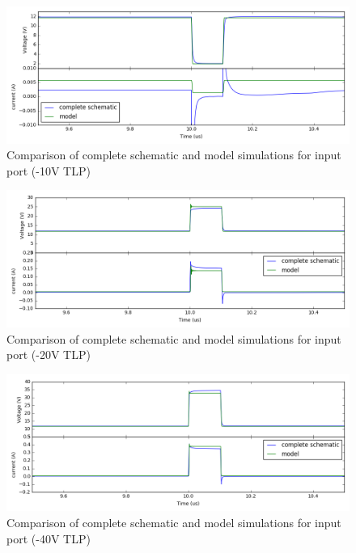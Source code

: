 \begin{figure}[!h]
  \centering
  \includegraphics[width=\textwidth]{src/4/figures/comparison_model_total_m10V.png}
  \caption{Comparison of complete schematic and model simulations for input port (-10V TLP)}
  \label{fig:compare-model-simu-m10}
\end{figure}

\begin{figure}[!h]
  \centering
  \includegraphics[width=\textwidth]{src/4/figures/comparison_model_total_20V.png}
  \caption{Comparison of complete schematic and model simulations for input port (-20V TLP)}
  \label{fig:compare-model-simu-20}
\end{figure}

\begin{figure}[!h]
  \centering
  \includegraphics[width=\textwidth]{src/4/figures/comparison_model_total_40V.png}
  \caption{Comparison of complete schematic and model simulations for input port (-40V TLP)}
  \label{fig:compare-model-simu-40}
\end{figure}

